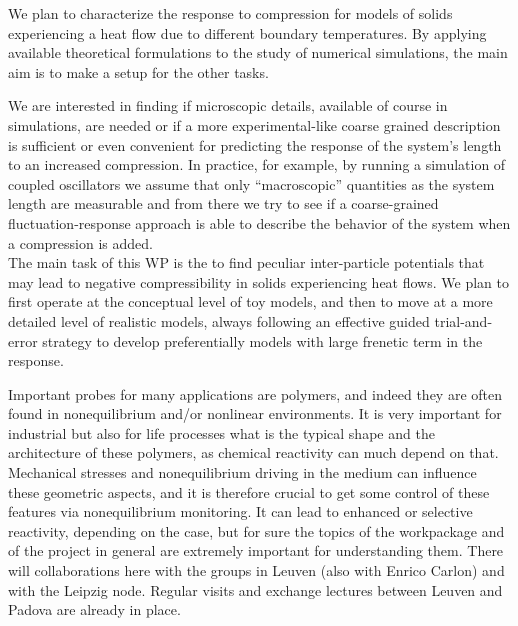 \begin{workpackage}
\begin{tasklist}
  \begin{task}[title=TASK1,id=task1,PM=3,lead=UNIPD,wphases={0-12!1,12-24!0.5}]
 
    We plan to characterize the response to compression
    for models of solids experiencing a heat flow due to different boundary temperatures.
    By applying available theoretical formulations to the study of numerical simulations,
    the main aim is to make a setup for the other tasks.
    
  \end{task}

  \begin{task}[title=TASK2,id=task2,PM=3,lead=UNIPD,partners=KUL,wphases={12-24!0.5,24-36!1}]

    We are interested in finding if microscopic details, available of course in simulations, 
    are needed or if a more experimental-like coarse grained description is sufficient or even convenient for
    predicting the response of the system's length to an increased compression. In practice, for example,
    by running a simulation of coupled oscillators we assume that only ``macroscopic'' quantities as the system length
    are measurable and from there we try to see if a coarse-grained fluctuation-response approach is able to
    describe the behavior of the system when a compression is added.\\
    The main task of this WP is the to
        find peculiar inter-particle potentials that may lead to negative 
        compressibility in solids experiencing heat flows. 
        We plan to first operate at the conceptual level of toy models, and then to move
        at a more detailed level of realistic models, always following an effective guided
        trial-and-error strategy to develop preferentially models with large
        frenetic term in the response.
    
  \end{task}

  \begin{task}[title=TASK3,id=task3,PM=6,lead=UNIPD,wphases={18-24!0.5,24-48!1},partners={KUL,ULEI}]
Important probes for many applications are polymers, and indeed they are often found in nonequilibrium and/or nonlinear environments.
It is very important for industrial but also for life processes what is the typical shape and the architecture of these polymers, as chemical reactivity can much depend on that.
Mechanical stresses and nonequilibrium driving in the medium can influence these geometric aspects, and it is therefore crucial to get some control of these features via nonequilibrium monitoring.
It can lead to enhanced or selective reactivity, depending on the case, but for sure the topics of the workpackage and of the project in general are extremely important for understanding them.
There will collaborations here with the groups in Leuven (also with Enrico Carlon) and with the Leipzig node.  Regular visits and exchange lectures between Leuven and Padova are already in place.
  \end{task}


\end{tasklist}
\end{workpackage}
